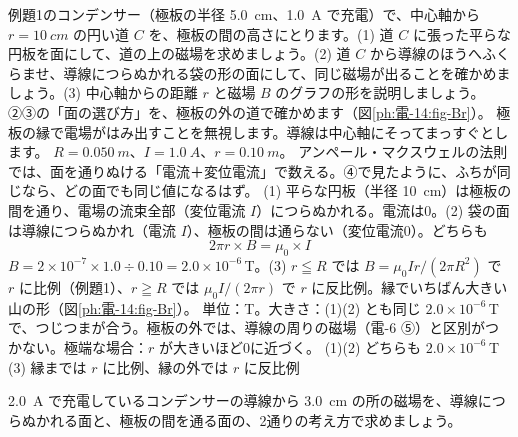 \begin{phreidai}
\label{ph:電-14:ex11}例題1のコンデンサー（極板の半径 \qty{5.0}{cm}、\qty{1.0}{A} で充電）で、中心軸から $r=\qty{10}{cm}$ の円い道 $C$ を、極板の間の高さにとります。(1) 道 $C$ に張った平らな円板を面にして、道の上の磁場を求めましょう。(2) 道 $C$ から導線のほうへふくらませ、導線につらぬかれる袋の形の面にして、同じ磁場が出ることを確かめましょう。(3) 中心軸からの距離 $r$ と磁場 $B$ のグラフの形を説明しましょう。
\phbamen
②③の「面の選び方」を、極板の外の道で確かめます（図\ref{ph:電-14:fig-Br}）。
\phmushi
極板の縁で電場がはみ出すことを無視します。導線は中心軸にそってまっすぐとします。
\phzu
$R=\qty{0.050}{m}$、$I=\qty{1.0}{A}$、$r=\qty{0.10}{m}$。
\phriyu
アンペール・マクスウェルの法則では、面を通りぬける「電流＋変位電流」で数える。④で見たように、ふちが同じなら、どの面でも同じ値になるはず。
\phtateru
(1) 平らな円板（半径 \qty{10}{cm}）は極板の間を通り、電場の流束全部（変位電流 $I$）につらぬかれる。電流は0。(2) 袋の面は導線につらぬかれ（電流 $I$）、極板の間は通らない（変位電流0）。どちらも
\[ 2\pi r\times B=\mu_0\times I \]
\phtoku
$B=2\times10^{-7}\times1.0\div0.10=2.0\times10^{-6}$\,T。(3) $r\leqq R$ では $B=\mu_0Ir/(2\pi R^2)$ で $r$ に比例（例題1）、$r\geqq R$ では $\mu_0I/(2\pi r)$ で $r$ に反比例。縁でいちばん大きい山の形（図\ref{ph:電-14:fig-Br}）。
\phtashikame
単位：T。大きさ：(1)(2) とも同じ $2.0\times10^{-6}$\,T で、つじつまが合う。極板の外では、導線の周りの磁場（電-6 ⑤）と区別がつかない。極端な場合：$r$ が大きいほど0に近づく。
\kotae (1)(2) どちらも $2.0\times10^{-6}$\,T　(3) 縁までは $r$ に比例、縁の外では $r$ に反比例
\end{phreidai}
\begin{jibun}
\qty{2.0}{A} で充電しているコンデンサーの導線から \qty{3.0}{cm} の所の磁場を、導線につらぬかれる面と、極板の間を通る面の、2通りの考え方で求めましょう。
\end{jibun}

